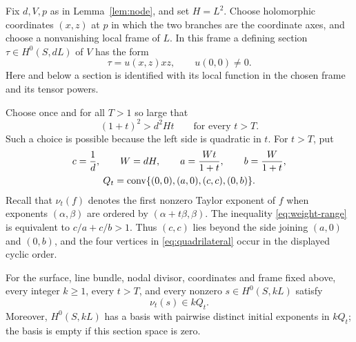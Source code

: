 Fix $d,V,p$ as in Lemma~\ref{lem:node}, and set $H=L^2$.
Choose holomorphic coordinates $(x,z)$ at $p$ in which the two branches
are the coordinate axes, and choose a nonvanishing local frame of $L$.
In this frame a defining section $\tau\in H^0(S,dL)$ of $V$ has the form
\begin{equation}
 \tau=u(x,z)xz,\qquad u(0,0)\ne0.
 \label{eq:node-unit}
\end{equation}
Here and below a section is identified with its local function in the
chosen frame and its tensor powers.

Choose once and for all $T>1$ so large that
\begin{equation}
 (1+t)^2>d^2Ht\qquad\text{for every }t>T.
 \label{eq:weight-range}
\end{equation}
Such a choice is possible because the left side is quadratic in $t$.
For $t>T$, put
\begin{equation}
 \begin{gathered}
 c=\frac1d,\qquad W=dH,\qquad
 a=\frac{Wt}{1+t},\qquad b=\frac{W}{1+t},\\
 Q_t=\operatorname{conv}\{(0,0),(a,0),(c,c),(0,b)\}.
 \end{gathered}
 \label{eq:quadrilateral}
\end{equation}
Recall that $\nu_t(f)$ denotes the first nonzero Taylor exponent of $f$
when exponents $(\alpha,\beta)$ are ordered by
$(\alpha+t\beta,\beta)$.  The inequality \eqref{eq:weight-range} is
equivalent to $c/a+c/b>1$.  Thus $(c,c)$ lies beyond the side joining
$(a,0)$ and $(0,b)$, and the four vertices in
\eqref{eq:quadrilateral} occur in the displayed cyclic order.

\begin{proposition}
\label{prop:quadrilateral}
For the surface, line bundle, nodal divisor, coordinates and frame fixed
above, every integer $k\ge1$, every $t>T$, and every nonzero
$s\in H^0(S,kL)$ satisfy
\[
 \nu_t(s)\in kQ_t.
\]
Moreover, $H^0(S,kL)$ has a basis with pairwise distinct initial exponents
in $kQ_t$; the basis is empty if this section space is zero.
\end{proposition}

